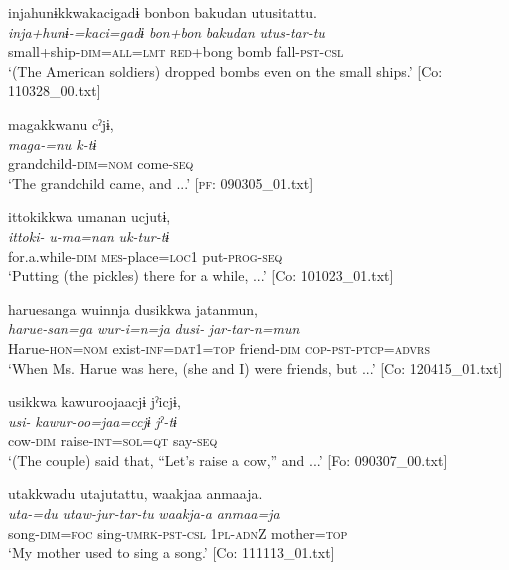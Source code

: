 \ex \label{ex:7:25c}%
\glll  injahunɨkkwakacigadɨ  {\textbar}bonbon  bakudan  utusi{\textbar}tattu.\\
\textit{inja+hunɨ-=kaci=gadɨ}  \textit{bon+bon}  \textit{bakudan}  \textit{utus-tar-tu}\\
small+ship-\textsc{dim}=\textsc{all}=\textsc{lmt}  \textsc{red}+bong  bomb  fall-\textsc{pst}-\textsc{csl}\\
\glt ‘(The American soldiers) dropped bombs even on the small ships.’ [Co: 110328\_00.txt]

\ex \label{ex:7:25d}  %
\glll  magakkwanu  cˀjɨ,\\
\textit{maga{}-=nu  k-tɨ}\\
grandchild-\textsc{dim}=\textsc{nom}  come-\textsc{seq}\\
\glt ‘The grandchild came, and ...’ [\textsc{pf}: 090305\_01.txt]

\ex \label{ex:7:25e}  %
\glll  {\textbar}ittoki{\textbar}kkwa  umanan  ucjutɨ,\\
\textit{ittoki-}  \textit{u-ma=nan}  \textit{uk-tur-tɨ}\\
for.a.while-\textsc{dim}  \textsc{mes}-place=\textsc{loc}1  put-\textsc{prog}-\textsc{seq}\\
\glt ‘Putting (the pickles) there for a while, ...’ [Co: 101023\_01.txt]

 \ex \label{ex:7:25f}
\glll  haruesanga  wuinnja  dusikkwa  jatanmun,\\
\textit{harue-san=ga}  \textit{wur-i=n=ja}  \textit{dusi-}  \textit{jar-tar-n=mun}\\
Harue-\textsc{hon}=\textsc{nom}  exist{}-\textsc{inf}=\textsc{dat}1=\textsc{top}  friend-\textsc{dim}  \textsc{cop}-\textsc{pst}-\textsc{ptcp}=\textsc{advrs}\\
\glt ‘When Ms. Harue was here, (she and I) were friends, but ...’ [Co: 120415\_01.txt]

\ex \label{ex:7:25g}  %
\glll  usikkwa  kawuroojaacjɨ  jˀicjɨ,\\
\textit{usi-}  \textit{kawur-oo=jaa=ccjɨ}  \textit{jˀ-tɨ}\\
cow-\textsc{dim}  raise-\textsc{int}=\textsc{sol}=\textsc{qt}  say-\textsc{seq}\\
\glt ‘(The couple) said that, “Let’s raise a cow,” and ...’ [Fo: 090307\_00.txt]

\ex \label{ex:7:25h} %
\glll  utakkwadu  utajutattu,  waakjaa  anmaaja.\\
\textit{uta-=du}  \textit{utaw-jur-tar-tu}  \textit{waakja-a}  \textit{anmaa=ja}\\
song-\textsc{dim}=\textsc{foc}  sing-\textsc{umrk}-\textsc{pst}-\textsc{csl}  1\textsc{pl}-\textsc{adn}Z  mother=\textsc{top}\\
\glt ‘My mother used to sing a song.’ [Co: 111113\_01.txt]

